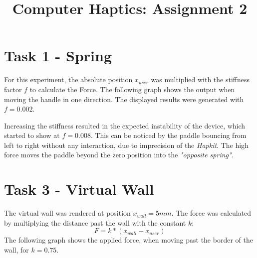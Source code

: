 



  \title{Computer Haptics: Assignment 2}
  \maketitle

  \section*{Task 1 - Spring}

  For this experiment, the absolute position $x_{user}$ was multiplied with the stiffness factor $f$ to calculate the Force. The following graph shows the output when moving the handle in one direction. The displayed results were generated with $f = 0.002$.

  \begin{figure}[H]
    \centering
  \end{figure}

  Increasing the stiffness resulted in the expected instability of the device, which started to show at $f = 0.008$. This can be noticed by the paddle bouncing from left to right without any interaction, due to imprecision of the \textit{Hapkit}. The high force moves the paddle beyond the zero position into the \textit{"opposite spring"}.

  \section*{Task 3 - Virtual Wall}

  The virtual wall was rendered at position $x_{wall} = 5mm$. The force was calculated by multiplying the distance past the wall with the constant $k$:
  \begin{equation*}
    F = k * (x_{wall} - x_{user})
  \end{equation*}
  The following graph shows the applied force, when moving past the border of the wall, for $k = 0.75$.

